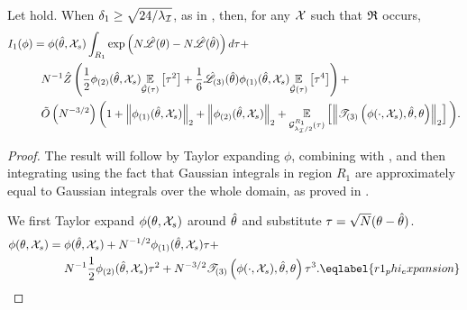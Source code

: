 \begin{lem}
%
Let  hold.  When $\delta_1 \ge \sqrt{24 / \lambda_\mathcal{I}}$, as in
, then, for any ${\mathcal{X}}$ such that
$\mathfrak{R}$ occurs,
%
\begin{align*}
%
\MoveEqLeft
I_1(\phi) =
    \phi(\thetahat, \xvec_s)
    \int_{R_1} \exp\left(
        N \likhat(\theta) - N \likhat(\thetahat)
    \right) d\tau +
\nonumber\\ &\quad
    N^{-1} \normalizer \left(
        \frac{1}{2} \phigrad{2}(\thetahat, \xvec_s) \expect{\normhat}{\tau^2} +
        \frac{1}{6} \likhatk{3}(\thetahat) \phigrad{1}(\thetahat, \xvec_s)
            \expect{\normhat}{\tau^4} \right) +
\nonumber\\ &\quad
    \ordlog{N^{-3/2}} \bigg(
        1 +
        \norm{\phigrad{1}(\thetahat, \xvec_s)}_2 +
        \norm{\phigrad{2}(\thetahat, \xvec_s)}_2 +
        \expect{\normresid{\infoev / 2}{R_1}(\tau)}{
            \norm{\tresid{3}{\phi(\cdot, \xvec_s), \thetahat, \theta}}_2}
    \bigg).
%
\end{align*}
%
\begin{proof}
%
The result will follow by Taylor expanding $\phi$, combining with
, and then integrating using the fact that
Gaussian integrals in region $R_1$ are approximately equal to Gaussian integrals
over the whole domain, as proved in .



We first Taylor expand $\phi(\theta, {\mathcal{X}}_s)$ around $\hat\theta$ and substitute
$\tau = \sqrt{N}(\theta - \hat\theta)$.
%
\begin{align}
\phi(\theta, \xvec_s) ={}&
    \phi(\thetahat, \xvec_s) +
    N^{-1/2} \phigrad{1}(\thetahat, \xvec_s) \tau + \nonumber \\
&
    N^{-1} \frac{1}{2} \phigrad{2}(\thetahat, \xvec_s) \tau^2 +
    N^{-3/2} \tresid{3}{\phi(\cdot, \xvec_s), \thetahat, \theta} \tau^3.
    \eqlabel{r1_phi_expansion}
\end{align}




\end{proof}
\end{lem}
